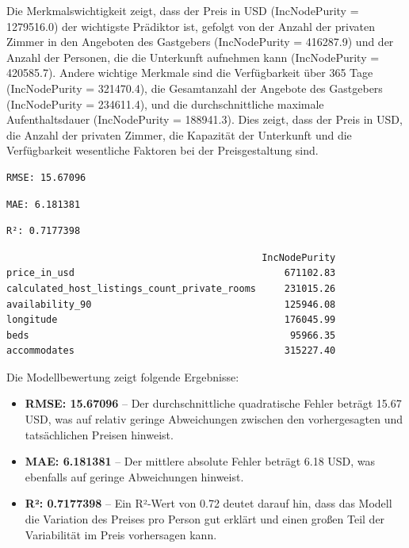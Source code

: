 \documentclass[
  journal,
]{IEEEtran}%
\begin{document}
Die Merkmalswichtigkeit zeigt, dass der Preis in USD (IncNodePurity =
1279516.0) der wichtigste Prädiktor ist, gefolgt von der Anzahl der
privaten Zimmer in den Angeboten des Gastgebers (IncNodePurity =
416287.9) und der Anzahl der Personen, die die Unterkunft aufnehmen kann
(IncNodePurity = 420585.7). Andere wichtige Merkmale sind die
Verfügbarkeit über 365 Tage (IncNodePurity = 321470.4), die Gesamtanzahl
der Angebote des Gastgebers (IncNodePurity = 234611.4), und die
durchschnittliche maximale Aufenthaltsdauer (IncNodePurity = 188941.3).
Dies zeigt, dass der Preis in USD, die Anzahl der privaten Zimmer, die
Kapazität der Unterkunft und die Verfügbarkeit wesentliche Faktoren bei
der Preisgestaltung sind.

\begin{verbatim}
RMSE: 15.67096 
\end{verbatim}

\begin{verbatim}
MAE: 6.181381 
\end{verbatim}

\begin{verbatim}
R²: 0.7177398 
\end{verbatim}

\begin{verbatim}
                                             IncNodePurity
price_in_usd                                     671102.83
calculated_host_listings_count_private_rooms     231015.26
availability_90                                  125946.08
longitude                                        176045.99
beds                                              95966.35
accommodates                                     315227.40
\end{verbatim}

Die Modellbewertung zeigt folgende Ergebnisse:

\begin{itemize}
\item
  \textbf{RMSE: 15.67096} -- Der durchschnittliche quadratische Fehler
  beträgt 15.67 USD, was auf relativ geringe Abweichungen zwischen den
  vorhergesagten und tatsächlichen Preisen hinweist.
\item
  \textbf{MAE: 6.181381} -- Der mittlere absolute Fehler beträgt 6.18
  USD, was ebenfalls auf geringe Abweichungen hinweist.
\item
  \textbf{R²: 0.7177398} -- Ein R²-Wert von 0.72 deutet darauf hin, dass
  das Modell die Variation des Preises pro Person gut erklärt und einen
  großen Teil der Variabilität im Preis vorhersagen kann.
\end{itemize}
\end{document}
